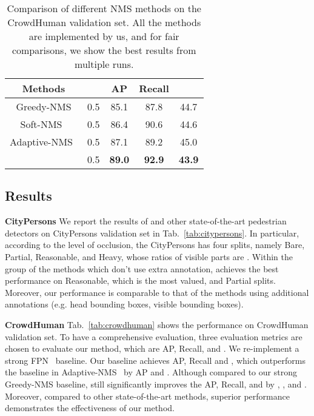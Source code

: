 \documentclass[sigconf]{acmart}
\begin{document}
 


\begin{table}[t]
\begin{center}
\begin{tabular}{ccccc}
\hline
Methods &   & AP & Recall &  \\
\hline
Greedy-NMS & 0.5 & 85.1 & 87.8 & 44.7\\
Soft-NMS~\cite{soft-nms} & 0.5 & 86.4 & 90.6 & 44.6 \\
Adaptive-NMS~\cite{adaptive-nms} & 0.5 & 87.1 & 89.2 & 45.0\\
\nmsname{} & 0.5 & \textbf{89.0} & \textbf{92.9} & \textbf{43.9}\\

\end{tabular}
\end{center}
\caption{Comparison of different NMS methods on the CrowdHuman validation set. {\normalfont All the methods are implemented by us, and for fair comparisons, we show the best results from multiple runs.}}
\vspace{-0.5cm}
\label{tab:ablation_nms}
\end{table}
 
\subsection{Results}
\label{sec:results}

\textbf{CityPersons} We report the results of \nmsname{} and other state-of-the-art pedestrian detectors on CityPersons validation set in Tab.~\ref{tab:citypersons}. In particular, according to the level of occlusion, the CityPersons has four splits, namely Bare, Partial, Reasonable, and Heavy, whose ratios of visible parts are . Within the group of the methods which don't use extra annotation, \nmsname{} achieves the best performance on Reasonable, which is the most valued, and Partial splits. Moreover, our performance is comparable to that of the methods using additional annotations (e.g. head bounding boxes, visible bounding boxes).

\textbf{CrowdHuman} 
Tab.~\ref{tab:crowdhuman} shows the performance on CrowdHuman validation set. To have a comprehensive evaluation, three evaluation metrics are chosen to evaluate our method, which are AP, Recall, and \mr{}. We re-implement a strong FPN~\cite{fpn} baseline. Our baseline achieves  AP,  Recall and  \mr{}, which outperforms the baseline in Adaptive-NMS~\cite{adaptive-nms} by  AP and  \mr{}. Although compared to our strong Greedy-NMS baseline, \nmsname{} still significantly improves the AP, Recall, and \mr{} by , , and . Moreover, compared to other state-of-the-art methods, superior performance demonstrates the effectiveness of our method.
\end{document}
